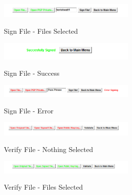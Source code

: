 \begin{figure}[hbt!]
	\centering
      \includegraphics[width=0.6\textwidth]{imgs/ria/sdigngreen} \\
	\caption{Sign File - Files Selected}
	\label{fig:specifiyingkeysize}
    \noindent\makebox[\linewidth]{}
\end{figure}

\begin{figure}[hbt!]
	\centering
      \includegraphics[width=0.6\textwidth]{imgs/ria/successsign} \\
	\caption{Sign File - Success}
	\label{fig:specifiyingkeysize}
    \noindent\makebox[\linewidth]{}
\end{figure}

\begin{figure}[hbt!]
	\centering
      \includegraphics[width=0.6\textwidth]{imgs/ria/error} \\
	\caption{Sign File - Error}
	\label{fig:specifiyingkeysize}
    \noindent\makebox[\linewidth]{}
\end{figure}

\begin{figure}[hbt!]
	\centering
      \includegraphics[width=0.6\textwidth]{imgs/ria/verifyred} \\
	\caption{Verify File - Nothing Selected}
	\label{fig:specifiyingkeysize}
    \noindent\makebox[\linewidth]{}
\end{figure}

\begin{figure}[hbt!]
	\centering
      \includegraphics[width=0.6\textwidth]{imgs/ria/verfygreen} \\
	\caption{Verify File - Files Selected}
	\label{fig:specifiyingkeysize}
    \noindent\makebox[\linewidth]{}
\end{figure}

